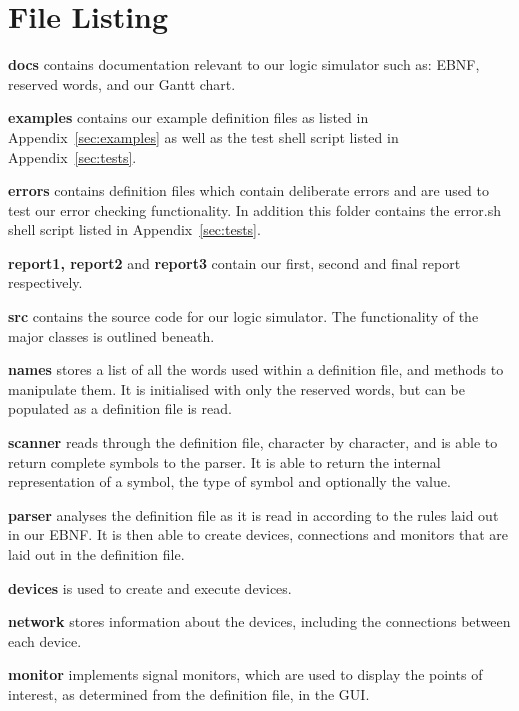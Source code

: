 \documentclass[a4paper,10pt]{article}
\begin{document}
\pagebreak

\section{File Listing}
\setlength{\DTbaselineskip}{15pt}
\DTsetlength{.2em}{3em}{0.1em}{1pt}{4pt}

\textbf{docs} contains documentation relevant to our logic simulator such as: EBNF, reserved words, and our Gantt chart.

\textbf{examples} contains our example definition files as listed in Appendix~\ref{sec:examples} as well as the test shell script listed in Appendix~\ref{sec:tests}.

\textbf{errors} contains definition files which contain deliberate errors and are used to test our error checking functionality. In addition this folder contains the error.sh shell script listed in Appendix~\ref{sec:tests}.

\textbf{report1, report2} and \textbf{report3} contain our first, second and final report respectively.

\textbf{src} contains the source code for our logic simulator. The functionality of the major classes is outlined beneath.

\textbf{names} stores a list of all the words used within a definition file, and methods to manipulate them. It is initialised with only the reserved words, but can be populated as a definition file is read.

\textbf{scanner} reads through the definition file, character by character, and is able to return complete symbols to the parser. It is able to return the internal representation of a symbol, the type of symbol and optionally the value.

\textbf{parser} analyses the definition file as it is read in according to the rules laid out in our EBNF. It is then able to create devices, connections and monitors that are laid out in the definition file.

\textbf{devices} is used to create and execute devices. 

\textbf{network} stores information about the devices, including the connections between each device.

\textbf{monitor} implements signal monitors, which are used to display the points of interest, as determined from the definition file, in the GUI.
\end{document}
